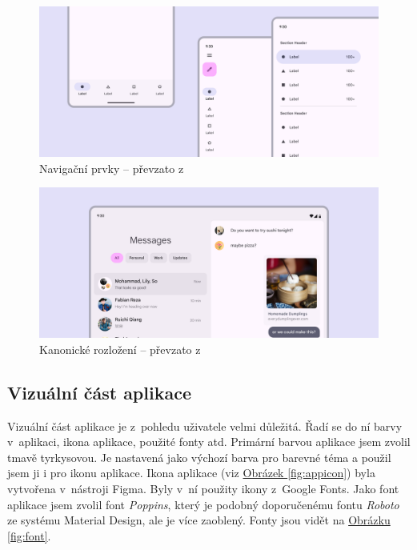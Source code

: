 \documentclass[
  biblatex,
  figures=true,
  tables=false,
  glossaries,
  index
]{kidiplom}
\begin{document}
\begin{figure}
  \centering 
  \includegraphics[width=\textwidth]{images/navigation.png}
  \caption{Navigační prvky -- převzato z~\cite{m3}}
  \label{fig:navigation}
\end{figure}

\begin{figure}
  \centering 
  \includegraphics[width=\textwidth]{images/canonical-layout.png}
  \caption{Kanonické rozložení -- převzato z~\cite{m3}}
  \label{fig:canonical-layout}
\end{figure}

\subsection{Vizuální část aplikace}
Vizuální část aplikace je z~pohledu uživatele velmi důležitá. Řadí se do ní barvy v~aplikaci, ikona aplikace, použité fonty atd. Primární barvou aplikace jsem zvolil tmavě tyrkysovou. Je nastavená jako výchozí barva pro barevné téma a použil jsem ji i pro ikonu aplikace. Ikona aplikace (viz \hyperref[fig:appicon]{Obrázek \ref{fig:appicon}}) byla vytvořena v~nástroji Figma. Byly v~ní použity ikony z~Google Fonts. Jako font aplikace jsem zvolil font \textit{Poppins}, který je podobný doporučenému fontu \textit{Roboto} ze systému Material Design, ale je více zaoblený. Fonty jsou vidět na \hyperref[fig:font]{Obrázku \ref{fig:font}}. 
\end{document}
